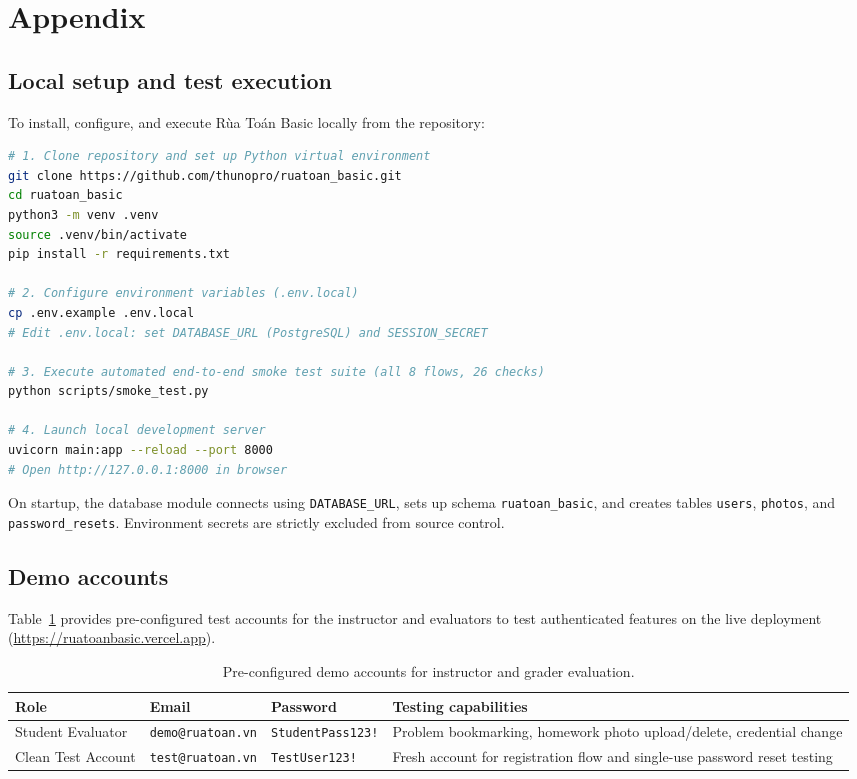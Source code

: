 \section{Appendix}

\subsection{Local setup and test execution}
To install, configure, and execute Rùa Toán Basic locally from the repository:
\begin{lstlisting}[language=bash,numbers=none]
# 1. Clone repository and set up Python virtual environment
git clone https://github.com/thunopro/ruatoan_basic.git
cd ruatoan_basic
python3 -m venv .venv
source .venv/bin/activate
pip install -r requirements.txt

# 2. Configure environment variables (.env.local)
cp .env.example .env.local
# Edit .env.local: set DATABASE_URL (PostgreSQL) and SESSION_SECRET

# 3. Execute automated end-to-end smoke test suite (all 8 flows, 26 checks)
python scripts/smoke_test.py

# 4. Launch local development server
uvicorn main:app --reload --port 8000
# Open http://127.0.0.1:8000 in browser
\end{lstlisting}
On startup, the database module connects using \texttt{DATABASE\_URL}, sets up schema
\texttt{ruatoan\_basic}, and creates tables \texttt{users}, \texttt{photos}, and \texttt{password\_resets}.
Environment secrets are strictly excluded from source control.

\subsection{Demo accounts}
Table~\ref{tab:demo-accounts} provides pre-configured test accounts for the instructor and evaluators to test
authenticated features on the live deployment (\url{https://ruatoanbasic.vercel.app}).

\begin{table}[ht]
\centering\small
\begin{tabularx}{0.92\textwidth}{@{}l l l >{\raggedright\arraybackslash}X@{}}
\toprule
\textbf{Role} & \textbf{Email} & \textbf{Password} & \textbf{Testing capabilities}\\
\midrule
Student Evaluator & \texttt{demo@ruatoan.vn} & \texttt{StudentPass123!} & Problem bookmarking, homework photo upload/delete, credential change\\
Clean Test Account & \texttt{test@ruatoan.vn} & \texttt{TestUser123!} & Fresh account for registration flow and single-use password reset testing\\
\bottomrule
\end{tabularx}
\caption{Pre-configured demo accounts for instructor and grader evaluation.}
\label{tab:demo-accounts}
\end{table}

